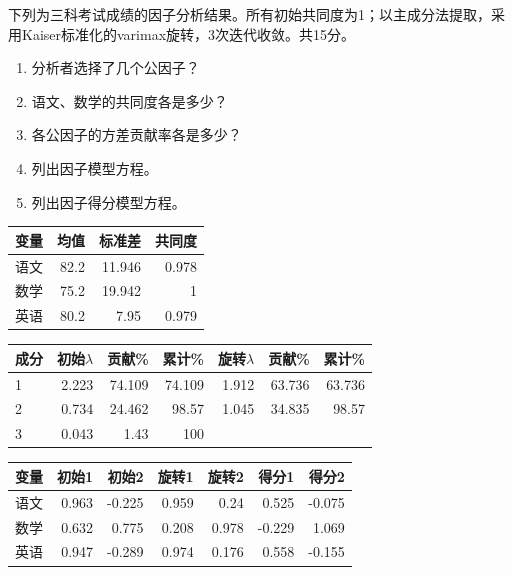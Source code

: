 

下列为三科考试成绩的因子分析结果。所有初始共同度为1；以主成分法提取，采用Kaiser标准化的varimax旋转，3次迭代收敛。共15分。

\begin{enumerate}
\def\labelenumi{\arabic{enumi}.}
\tightlist
\item
  分析者选择了几个公因子？
\item
  语文、数学的共同度各是多少？
\item
  各公因子的方差贡献率各是多少？
\item
  列出因子模型方程。
\item
  列出因子得分模型方程。
\end{enumerate}

\begin{center}\small\setlength{\tabcolsep}{4pt}\renewcommand{\arraystretch}{1.18}\begin{tabular}{@{}lrrr@{}}
\toprule
变量 & 均值 & 标准差 & 共同度 \\
\midrule

语文 & 82.2 & 11.946 & 0.978 \\
数学 & 75.2 & 19.942 & 1 \\
英语 & 80.2 & 7.95 & 0.979 \\
\bottomrule\end{tabular}\end{center}

\begin{center}\small\setlength{\tabcolsep}{4pt}\renewcommand{\arraystretch}{1.18}\begin{tabular}{@{}lrrrrrr@{}}
\toprule
成分 & 初始\(\lambda\) & 贡献\% & 累计\% & 旋转\(\lambda\) & 贡献\% & 累计\% \\
\midrule

1 & 2.223 & 74.109 & 74.109 & 1.912 & 63.736 & 63.736 \\
2 & 0.734 & 24.462 & 98.57 & 1.045 & 34.835 & 98.57 \\
3 & 0.043 & 1.43 & 100 & & & \\
\bottomrule\end{tabular}\end{center}

\begin{center}\small\setlength{\tabcolsep}{4pt}\renewcommand{\arraystretch}{1.18}\begin{tabular}{@{}lrrrrrr@{}}
\toprule
变量 & 初始1 & 初始2 & 旋转1 & 旋转2 & 得分1 & 得分2 \\
\midrule

语文 & 0.963 & -0.225 & 0.959 & 0.24 & 0.525 & -0.075 \\
数学 & 0.632 & 0.775 & 0.208 & 0.978 & -0.229 & 1.069 \\
英语 & 0.947 & -0.289 & 0.974 & 0.176 & 0.558 & -0.155 \\
\bottomrule\end{tabular}\end{center}


